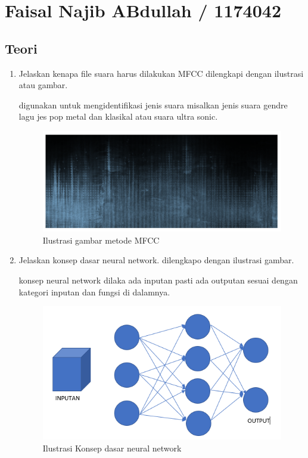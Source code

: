 \section{Faisal Najib ABdullah / 1174042}
\subsection{Teori}

\begin{enumerate}

\item Jelaskan kenapa file suara harus dilakukan MFCC dilengkapi dengan ilustrasi atau gambar.\par
digunakan untuk mengidentifikasi jenis suara misalkan jenis suara gendre lagu jes pop metal dan klasikal atau suara ultra sonic.
\begin{figure}[ht]
\centering
\includegraphics[scale=0.5]{figures/1174042/chapter6/1,1.PNG}
\caption{Ilustrasi gambar metode MFCC}
\label{contoh}
\end{figure}


\item Jelaskan konsep dasar neural network. dilengkapo dengan ilustrasi gambar. \par
konsep neural network dilaka ada inputan pasti ada outputan sesuai dengan kategori inputan dan fungsi di dalamnya.
\begin{figure}[ht]
\centering
\includegraphics[scale=0.5]{figures/1174042/chapter6/1,2.PNG}
\caption{Ilustrasi Konsep dasar neural network}
\label{contoh}
\end{figure}



\end{enumerate}
